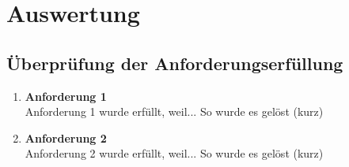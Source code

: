 \chapter{Auswertung}

\section{Überprüfung der Anforderungserfüllung}
\begin{enumerate}
	\item \textbf{Anforderung 1}\\
		Anforderung 1 wurde erfüllt, weil... So wurde es gelöst (kurz)

	\item \textbf{Anforderung 2}\\
		Anforderung 2 wurde erfüllt, weil... So wurde es gelöst (kurz)
		
\end{enumerate}